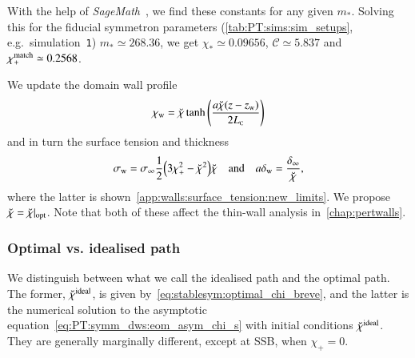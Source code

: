 With the help of \textit{SageMath}~\citep{sagemath}, we find these constants for any given $m_\ast$. 
Solving this for the fiducial symmetron parameters (\cref{tab:PT:sims:sim_setups}, e.g.~simulation~\texttt{1}) %
$m_\ast \simeq 268.36$, we get $\chi_\ast \simeq 0.09656$, $\mathcal{C}\simeq 5.837$ and $\chi_+^\mathrm{match}\simeq 0.2568$. 

We update the domain wall profile
\begin{equation}\label{eq:stablesym:chi_w_quasistatic_FLRW_updated}
    \chi_\mathrm{w} = \breve{\chi} \tanh{{\left(  \frac{a\breve{\chi}(z-z\ensuremath{_\mathrm{w}})}{2L_{\text{\tiny{C}}}}  \right)}}
\end{equation}
and in turn the surface tension and thickness
\begin{equation}
    \sigma_\mathrm{w} = \sigma_\infty \frac{1}{2} {\left(  3\chi_+^2- \breve{\chi}^2  \right)}\breve{\chi} \quad\text{and}\quad a\delta_\mathrm{w} = \frac{\delta_\infty}{\breve{\chi}} ,
\end{equation}
where the latter is shown~\cref{app:walls:surface_tension:new_limits}. We propose $\breve{\chi}= \breve{\chi}\rvert_\mathrm{opt}$. %
Note that both of these affect the thin-wall analysis in~\cref{chap:pertwalls}.




\subsubsection{Optimal vs. idealised path}
    We distinguish between what we call the idealised path and the optimal path. The former, $\breve{\chi}^\mathrm{ideal}$, is given by~\cref{eq:stablesym:optimal_chi_breve}, and the latter is the numerical solution to the asymptotic equation~\cref{eq:PT:symm_dws:eom_asym_chi_s} with initial conditions $\breve{\chi}^\mathrm{ideal}$. They are generally marginally different, except at SSB, when $\chi_+ = 0$.

